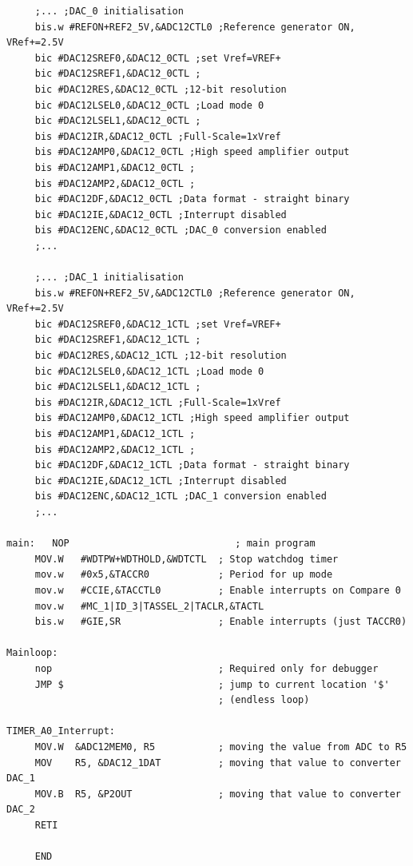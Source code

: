 \documentclass{article}
\begin{document}
\begin{verbatim}
     ;... ;DAC_0 initialisation 
     bis.w #REFON+REF2_5V,&ADC12CTL0 ;Reference generator ON, VRef+=2.5V
     bic #DAC12SREF0,&DAC12_0CTL ;set Vref=VREF+
     bic #DAC12SREF1,&DAC12_0CTL ;
     bic #DAC12RES,&DAC12_0CTL ;12-bit resolution
     bic #DAC12LSEL0,&DAC12_0CTL ;Load mode 0
     bic #DAC12LSEL1,&DAC12_0CTL ;
     bis #DAC12IR,&DAC12_0CTL ;Full-Scale=1xVref
     bis #DAC12AMP0,&DAC12_0CTL ;High speed amplifier output 
     bis #DAC12AMP1,&DAC12_0CTL ; 
     bis #DAC12AMP2,&DAC12_0CTL ;
     bic #DAC12DF,&DAC12_0CTL ;Data format - straight binary 
     bic #DAC12IE,&DAC12_0CTL ;Interrupt disabled 
     bis #DAC12ENC,&DAC12_0CTL ;DAC_0 conversion enabled 
     ;...

     ;... ;DAC_1 initialisation 
     bis.w #REFON+REF2_5V,&ADC12CTL0 ;Reference generator ON, VRef+=2.5V
     bic #DAC12SREF0,&DAC12_1CTL ;set Vref=VREF+
     bic #DAC12SREF1,&DAC12_1CTL ;
     bic #DAC12RES,&DAC12_1CTL ;12-bit resolution
     bic #DAC12LSEL0,&DAC12_1CTL ;Load mode 0
     bic #DAC12LSEL1,&DAC12_1CTL ;
     bis #DAC12IR,&DAC12_1CTL ;Full-Scale=1xVref
     bis #DAC12AMP0,&DAC12_1CTL ;High speed amplifier output 
     bis #DAC12AMP1,&DAC12_1CTL ; 
     bis #DAC12AMP2,&DAC12_1CTL ;
     bic #DAC12DF,&DAC12_1CTL ;Data format - straight binary 
     bic #DAC12IE,&DAC12_1CTL ;Interrupt disabled 
     bis #DAC12ENC,&DAC12_1CTL ;DAC_1 conversion enabled 
     ;... 

main:   NOP                             ; main program
     MOV.W   #WDTPW+WDTHOLD,&WDTCTL  ; Stop watchdog timer
     mov.w   #0x5,&TACCR0            ; Period for up mode
     mov.w   #CCIE,&TACCTL0          ; Enable interrupts on Compare 0
     mov.w   #MC_1|ID_3|TASSEL_2|TACLR,&TACTL
     bis.w   #GIE,SR                 ; Enable interrupts (just TACCR0)

Mainloop:
     nop                             ; Required only for debugger
     JMP $                           ; jump to current location '$'                                       
                                     ; (endless loop)

TIMER_A0_Interrupt:
     MOV.W  &ADC12MEM0, R5           ; moving the value from ADC to R5
     MOV    R5, &DAC12_1DAT          ; moving that value to converter DAC_1 
     MOV.B  R5, &P2OUT               ; moving that value to converter DAC_2
     RETI

     END\end{verbatim}
\end{document}
